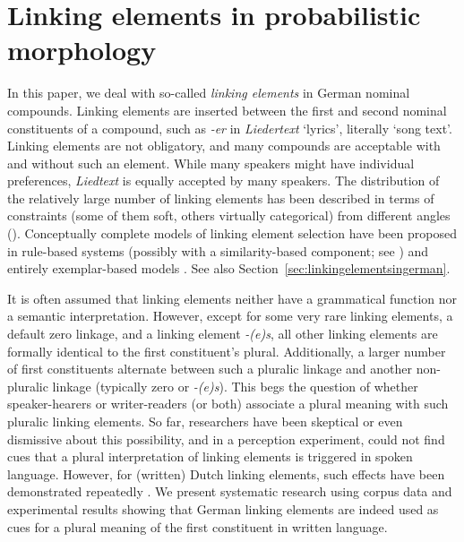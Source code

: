 \section{Linking elements in probabilistic morphology}
\label{sec:linkingelementsinprobabilisticmorphology}

In this paper, we deal with so-called \textit{linking elements} in German nominal compounds.
Linking elements are inserted between the first and second nominal constituents of a compound, such as \textit{-er} in \textit{Liedertext} `lyrics', literally `song text'.
Linking elements are not obligatory, and many compounds are acceptable with and without such an element.
While many speakers might have individual preferences, \textit{Liedtext} is equally accepted by many speakers.
The distribution of the relatively large number of linking elements has been described in terms of constraints (some of them soft, others virtually categorical) from different angles (\egg \citealt{Fuhrhop1996,Wegener2003,Schluecker2012,NueblingSzczepaniak2013,FuhrhopKuerschner2015}).
Conceptually complete models of linking element selection have been proposed in rule-based systems (possibly with a similarity-based component; see \citealt{DresslerEa2001}) and entirely exemplar-based models \parencite{KrottEa2007}.
See also Section~\ref{sec:linkingelementsingerman}.

It is often assumed that linking elements neither have a grammatical function nor a semantic interpretation.
However, except for some very rare linking elements, a default zero linkage, and a linking element \textit{-(e)s}, all other linking elements are formally identical to the first constituent's plural.
Additionally, a larger number of first constituents alternate between such a pluralic linkage and another non-pluralic linkage (typically zero or \textit{-(e)s}).
This begs the question of whether speaker-hearers or writer-readers (or both) associate a plural meaning with such pluralic linking elements.
So far, researchers have been skeptical or even dismissive about this possibility, and in a perception experiment, \textcite{KoesterEa2004} could not find cues that a plural interpretation of linking elements is triggered in spoken language.
However, for (written) Dutch linking elements, such effects have been demonstrated repeatedly \parencite{SchreuderEa1998,BangaEa2012,BangaEa2013a,BangaEa2013b}.
We present systematic research using corpus data and experimental results showing that German linking elements are indeed used as cues for a plural meaning of the first constituent in written language.

